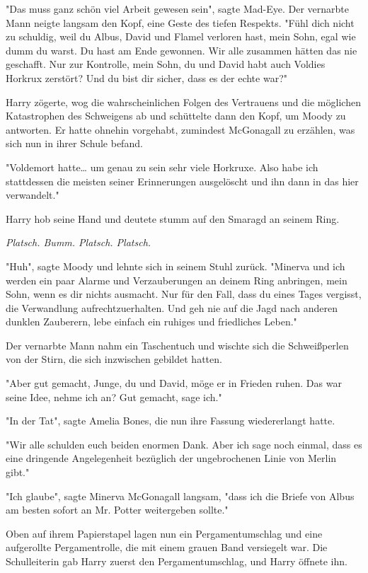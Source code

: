 {"Das muss ganz schön viel Arbeit gewesen sein", sagte Mad-Eye. Der vernarbte Mann neigte langsam den Kopf, eine Geste des tiefen Respekts. "Fühl dich nicht zu schuldig, weil du Albus, David und Flamel verloren hast, mein Sohn, egal wie dumm du warst. Du hast am Ende gewonnen. Wir alle zusammen hätten das nie geschafft. Nur zur Kontrolle, mein Sohn, du und David habt auch Voldies Horkrux zerstört? Und du bist dir sicher, dass es der echte war?"

Harry zögerte, wog die wahrscheinlichen Folgen des Vertrauens und die möglichen Katastrophen des Schweigens ab und schüttelte dann den Kopf, um Moody zu antworten. Er hatte ohnehin vorgehabt, zumindest McGonagall zu erzählen, was sich nun in ihrer Schule befand.

"Voldemort hatte… um genau zu sein sehr viele Horkruxe. Also habe ich stattdessen die meisten seiner Erinnerungen ausgelöscht und ihn dann in das hier verwandelt."

Harry hob seine Hand und deutete stumm auf den Smaragd an seinem Ring.

\emph{Platsch. Bumm. Platsch. Platsch.}

"Huh", sagte Moody und lehnte sich in seinem Stuhl zurück. "Minerva und ich werden ein paar Alarme und Verzauberungen an deinem Ring anbringen, mein Sohn, wenn es dir nichts ausmacht. Nur für den Fall, dass du eines Tages vergisst, die Verwandlung aufrechtzuerhalten. Und geh nie auf die Jagd nach anderen dunklen Zauberern, lebe einfach ein ruhiges und friedliches Leben."

Der vernarbte Mann nahm ein Taschentuch und wischte sich die Schweißperlen von der Stirn, die sich inzwischen gebildet hatten.

"Aber gut gemacht, Junge, du und David, möge er in Frieden ruhen. Das war seine Idee, nehme ich an? Gut gemacht, sage ich."

"In der Tat", sagte Amelia Bones, die nun ihre Fassung wiedererlangt hatte.

"Wir alle schulden euch beiden enormen Dank. Aber ich sage noch einmal, dass es eine dringende Angelegenheit bezüglich der ungebrochenen Linie von Merlin gibt."

"Ich glaube", sagte Minerva McGonagall langsam, "dass ich die Briefe von Albus am besten sofort an Mr. Potter weitergeben sollte."

Oben auf ihrem Papierstapel lagen nun ein Pergamentumschlag und eine aufgerollte Pergamentrolle, die mit einem grauen Band versiegelt war. Die Schulleiterin gab Harry zuerst den Pergamentumschlag, und Harry öffnete ihn.

}
